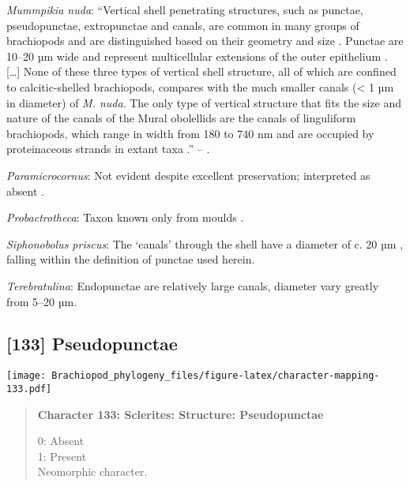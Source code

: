 \documentclass[openany]{book}
\theoremstyle{definition}
\theoremstyle{definition}
\theoremstyle{definition}
\theoremstyle{remark}
\begin{document}
\hypertarget{Mummpikia_nuda-coding-132}{}
\emph{Mummpikia nuda}: ``Vertical shell penetrating structures, such as
punctae, pseudopunctae, extropunctae and canals, are common in many
groups of brachiopods and are distinguished based on their geometry and
size \citep{Williams1997Introduction}. Punctae are 10--20 µm wide and
represent multicellular extensions of the outer epithelium
\citep{Owen1969Thecaecum}. {[}\ldots{}{]} None of these three types of
vertical shell structure, all of which are confined to calcitic-shelled
brachiopods, compares with the much smaller canals (\textless{} 1 µm in
diameter) of \emph{M. nuda}. The only type of vertical structure that
fits the size and nature of the canals of the Mural obolellids are the
canals of linguliform brachiopods, which range in width from 180 to 740
nm and are occupied by proteinaceous strands in extant taxa
\citetext{\citealp[1994]{Williams1992Structureof}; \citealp{Williams1997Introduction}}.''
-- \citet{Balthasar2008iMummpikia}.

\hypertarget{Paramicrocornus-coding-132}{}
\emph{Paramicrocornus}: Not evident despite excellent preservation;
interpreted as absent \citep{Zhang2018Ahyolithid}.

\hypertarget{Probactrotheca-coding-132}{}
\emph{Probactrotheca}: Taxon known only from moulds \citep{Valent2012}.

\hypertarget{Siphonobolus_priscus-coding-132}{}
\emph{Siphonobolus priscus}: The `canals' through the shell have a
diameter of c. 20 µm \citep[text-fig. 2a]{Williams2004Chemicostructure},
falling within the definition of punctae used herein.

\hypertarget{Terebratulina-coding-132}{}
\emph{Terebratulina}: Endopunctae are relatively large canals, diameter
vary greatly from 5--20 µm.

\subsection*{{[}133{]} Pseudopunctae}\label{pseudopunctae}

\texttt{[image: Brachiopod\_phylogeny\_files/figure-latex/character-mapping-133.pdf]}

\begin{quote}
\textbf{Character 133: Sclerites: Structure: Pseudopunctae}

0: Absent\\
1: Present\\
Neomorphic character.
\end{quote}
\end{document}
